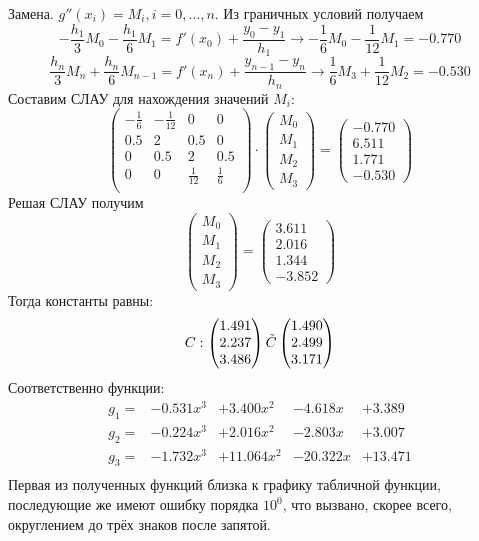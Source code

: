 \documentclass[a4paper]{article}
\begin{document}
Замена. \(g''(x_{i}) = M_{i}, i = 0, \ldots, n\). Из граничных условий получаем \[
  -\frac{h_{1}}{3} M_{0} - \frac{h_{1}}{6}M_{1} = f'(x_{0}) + \frac{y_{0}-y_{1}}{h_{1}} \rightarrow -\frac{1}{6} M_{0} - \frac{1}{12} M_{1} = -0.770
\]\[
  \frac{h_{n}}{3} M_{n} + \frac{h_{n}}{6} M_{n-1} = f'(x_{n}) + \frac{y_{n-1}-y_{n}}{h_{n}} \rightarrow \frac{1}{6} M_{3} + \frac{1}{12} M_{2} = -0.530
\]
Составим СЛАУ для нахождения значений \(M_{i}\): \[
\begin{pmatrix}
  -\frac{1}{6} & -\frac{1}{12} & 0 & 0\\
  0.5 & 2 & 0.5 & 0\\
  0 & 0.5 & 2 & 0.5 \\
  0 & 0 & \frac{1}{12} & \frac{1}{6} \\
\end{pmatrix} \cdot
\begin{pmatrix}
 M_{0} \\ M_{1} \\ M_{2} \\ M_{3}
\end{pmatrix} = \begin{pmatrix}
  -0.770\\ 6.511 \\ 1.771 \\ -0.530
\end{pmatrix}
\]
Решая СЛАУ получим \[
\begin{pmatrix}
 M_{0} \\ M_{1} \\ M_{2} \\ M_{3}
\end{pmatrix} = \begin{pmatrix}
  3.611 \\ 2.016 \\ 1.344 \\ -3.852
\end{pmatrix}
\] Тогда константы равны: \[
  C: \begin{pmatrix}
    1.491 \\ 2.237 \\ 3.486
  \end{pmatrix} \\ \tilde{C} \begin{pmatrix}
    1.490 \\ 2.499 \\ 3.171
  \end{pmatrix}
\]
Соответственно функции: \[
  \begin{matrix}
    g_{1} = &-0.531x^{3} &+ 3.400x^{2} &-4.618x &+3.389\\
    g_{2} = &-0.224x^{3} &+ 2.016x^{2} &-2.803x &+3.007\\
    g_{3} = &-1.732x^{3} &+11.064x^{2} &-20.322x&+13.471\\
  \end{matrix}
\]
Первая из полученных функций близка к графику табличной функции, последующие же имеют ошибку порядка \(10^{0}\), что
вызвано, скорее всего, округлением до трёх знаков после запятой.
\end{document}
